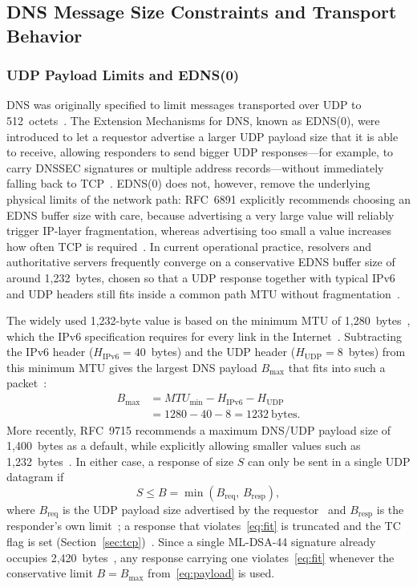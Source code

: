 \documentclass[conference]{IEEEtran}
\begin{document}
\subsection{DNS Message Size Constraints and Transport Behavior}

\subsubsection{UDP Payload Limits and EDNS(0)}
\label{sec:udp}

DNS was originally specified to limit messages transported over UDP to
512~octets~\cite{rfc1035}. The Extension Mechanisms for DNS, known as EDNS(0),
were introduced to let a requestor advertise a larger UDP payload size that it
is able to receive, allowing responders to send bigger UDP responses---for
example, to carry DNSSEC signatures or multiple address records---without
immediately falling back to TCP~\cite{rfc6891}. EDNS(0) does not, however,
remove the underlying physical limits of the network path: RFC~6891 explicitly
recommends choosing an EDNS buffer size with care, because advertising a very
large value will reliably trigger IP-layer fragmentation, whereas advertising
too small a value increases how often TCP is required~\cite{rfc6891}. In
current operational practice, resolvers and authoritative servers frequently
converge on a conservative EDNS buffer size of around 1,232~bytes, chosen so
that a UDP response together with typical IPv6 and UDP headers still fits
inside a common path MTU without fragmentation~\cite{rfc6891,cloudflaremtu}.

The widely used 1,232-byte value is based on the minimum MTU of
1,280~bytes~\cite{rfc9715}, which the IPv6 specification requires for every
link in the Internet~\cite{rfc8200}. Subtracting the IPv6 header
($H_\text{IPv6} = 40$~bytes) and the UDP header ($H_\text{UDP} = 8$~bytes)
from this minimum MTU gives the largest DNS payload $B_\text{max}$ that fits
into such a packet~\cite{turbodns}:
\begin{equation}
\begin{aligned}
B_\text{max} &= \mathit{MTU}_\text{min} - H_\text{IPv6} - H_\text{UDP}\\
&= 1280 - 40 - 8 = 1232~\text{bytes}.
\end{aligned}
\label{eq:payload}
\end{equation}
More recently, RFC~9715 recommends a maximum DNS/UDP payload size of
1,400~bytes as a default, while explicitly allowing smaller values such as
1,232~bytes~\cite{rfc9715}. In either case, a response of size $S$ can only be
sent in a single UDP datagram if
\begin{equation}
S \leq B = \min\left(B_\text{req},\, B_\text{resp}\right),
\label{eq:fit}
\end{equation}
where $B_\text{req}$ is the UDP payload size advertised by the
requestor~\cite{rfc6891} and $B_\text{resp}$ is the responder's own
limit~\cite{rfc9715}; a response that violates~\eqref{eq:fit} is truncated and
the TC flag is set (Section~\ref{sec:tcp})~\cite{rfc1035,rfc6891}. Since a
single ML-DSA-44 signature already occupies 2,420~bytes~\cite{mldsadraft}, any
response carrying one violates~\eqref{eq:fit} whenever the conservative limit
$B = B_\text{max}$ from~\eqref{eq:payload} is used.
\end{document}
